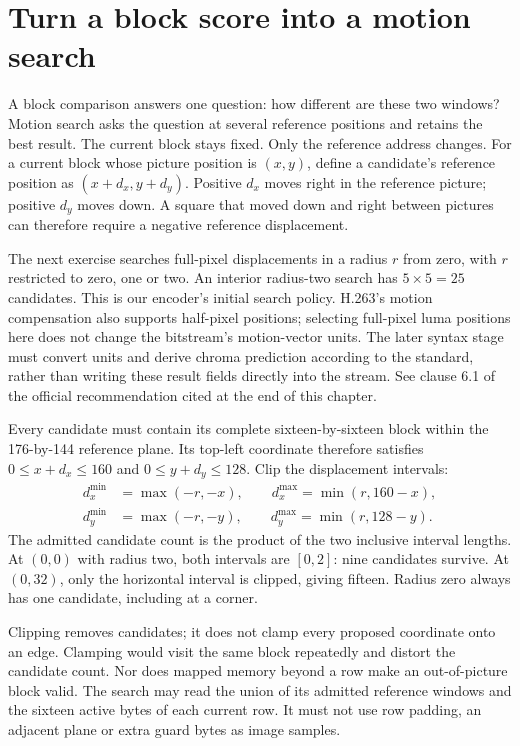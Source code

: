 \section{Turn a block score into a motion search}
A block comparison answers one question: how different are these two windows?
Motion search asks the question at several reference positions and retains the
best result. The current block stays fixed. Only the reference address changes.
For a current block whose picture position is $(x,y)$, define a candidate's
reference position as $(x+d_x,y+d_y)$. Positive $d_x$ moves right in the reference
picture; positive $d_y$ moves down. A square that moved down and right between
pictures can therefore require a negative reference displacement.

The next exercise searches full-pixel displacements in a radius $r$ from zero,
with $r$ restricted to zero, one or two. An interior radius-two search has
$5\times5=25$ candidates. This is our encoder's initial search policy. H.263's
motion compensation also supports half-pixel positions; selecting full-pixel
luma positions here does not change the bitstream's motion-vector units. The
later syntax stage must convert units and derive chroma prediction according to
the standard, rather than writing these result fields directly into the stream.
See clause 6.1 of the official recommendation cited at the end of this chapter.

Every candidate must contain its complete sixteen-by-sixteen block within the
176-by-144 reference plane. Its top-left coordinate therefore satisfies
$0\leq x+d_x\leq160$ and $0\leq y+d_y\leq128$. Clip the displacement intervals:
\[
  \begin{split}
    d_x^{\min} & =\max(-r,-x),\qquad
    d_x^{\max}=\min(r,160-x),        \\
    d_y^{\min} & =\max(-r,-y),\qquad
    d_y^{\max}=\min(r,128-y).
  \end{split}
\]
The admitted candidate count is the product of the two inclusive interval lengths.
At $(0,0)$ with radius two, both intervals are $[0,2]$: nine candidates survive.
At $(0,32)$, only the horizontal interval is clipped, giving fifteen. Radius zero
always has one candidate, including at a corner.

Clipping removes candidates; it does not clamp every proposed coordinate onto an
edge. Clamping would visit the same block repeatedly and distort the candidate
count. Nor does mapped memory beyond a row make an out-of-picture block valid.
The search may read the union of its admitted reference windows and the sixteen
active bytes of each current row. It must not use row padding, an adjacent plane
or extra guard bytes as image samples.

